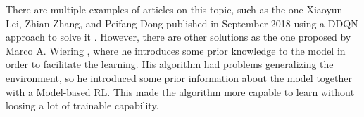 		There are multiple examples of articles on this topic, such as the one Xiaoyun Lei, Zhian Zhang, and Peifang Dong published in September 2018 using a DDQN approach to solve it \cite{lei_dynamic_2018}. However, there are other solutions as the one proposed by Marco A. Wiering \cite{wiering_reinforcement_2001}, where he introduces some prior knowledge to the model in order to facilitate the learning. His algorithm had problems generalizing the environment, so he introduced some prior information about the model together with a Model-based RL. This made the algorithm more capable to learn without loosing a lot of trainable capability.
		
		
